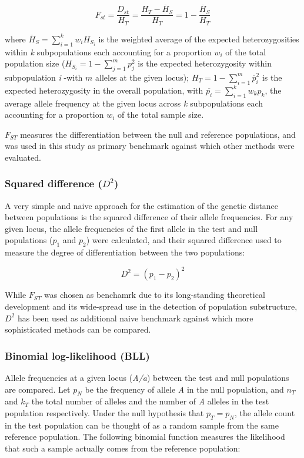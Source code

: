 \documentclass{bmcart}
\begin{document}
\begin{equation} \label{eq:fstnei}
F_{st}=\frac{D_{st}}{H_T}=\frac{H_T-\overline{H}_S}{H_T}=1-\frac{\overline{H}_S}{H_T}  
\end{equation}

where $\overline{H}_S=\sum_{i=1}^k w_iH_{S_i}$ is the weighted average of the expected heterozygosities within
\emph{k} subpopulations each accounting for a proportion $w_i$ of the total
population size ($H_{S_i}=1-\sum_{j=1}^{m} p_j^2$
is the expected heterozygosity within subpopulation \emph{i} -with $m$
alleles at the given locus); $H_T=1-\sum_{i=1}^m \overline{p}_{i}^2$
is the expected heterozygosity in the overall
population, with $\overline{p_i}=\sum_{i=1}^k w_k p_k$, the average
allele frequency at the given locus across \emph{k} subpopulations
each accounting for a proportion $w_i$ of the total sample size.

$F_{ST}$ measures the differentiation between the null and reference
populations, and was used in this study as primary benchmark against
which other methods were evaluated. 

\subsubsection*{Squared difference ($D^2$)}
A very simple and naive approach for the estimation of the genetic
distance between populations is the squared difference of their allele
frequencies. For any given locus, the allele frequencies of the first
allele in the test and
null populations ($p_1$ and $p_2$) were calculated, and their squared difference used to
measure the degree of differentiation between the two populations:

\begin{equation}
D^2=(p_1-p_2)^2
\end{equation}

While $F_{ST}$ was chosen as benchamrk due to its long-standing theoretical
development and its wide-spread use in the detection of population
substructure, $D^2$ has been used as additional naive benchmark against which
more sophisticated methods can be compared. 

\subsubsection*{Binomial log-likelihood (BLL)}
Allele frequencies at a given locus (\emph{A/a}) between the test
and null populations are compared. Let $p_N$ be the frequency of
allele \emph{A} in the null population, and $n_T$ and $k_T$ the total number of
alleles and the number of \emph{A} alleles in the test population
respectively. Under the null hypothesis that $p_T=p_N$, the allele count
in the test population can be thought of as a random sample from the
same reference population. The following binomial function measures the likelihood
that such a sample actually comes from the reference population:  
\end{document}
